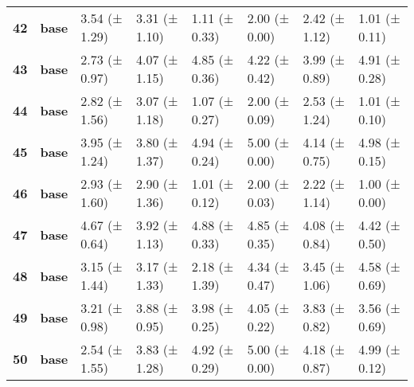 \begin{longtable}{llllllll}
\cline{1-8}
\textbf{42} & \textbf{base} & 3.54 (± 1.29) & 3.31 (± 1.10) & 1.11 (± 0.33) & 2.00 (± 0.00) & 2.42 (± 1.12) & 1.01 (± 0.11) \\
\cline{1-8}
\textbf{43} & \textbf{base} & 2.73 (± 0.97) & 4.07 (± 1.15) & 4.85 (± 0.36) & 4.22 (± 0.42) & 3.99 (± 0.89) & 4.91 (± 0.28) \\
\cline{1-8}
\textbf{44} & \textbf{base} & 2.82 (± 1.56) & 3.07 (± 1.18) & 1.07 (± 0.27) & 2.00 (± 0.09) & 2.53 (± 1.24) & 1.01 (± 0.10) \\
\cline{1-8}
\textbf{45} & \textbf{base} & 3.95 (± 1.24) & 3.80 (± 1.37) & 4.94 (± 0.24) & 5.00 (± 0.00) & 4.14 (± 0.75) & 4.98 (± 0.15) \\
\cline{1-8}
\textbf{46} & \textbf{base} & 2.93 (± 1.60) & 2.90 (± 1.36) & 1.01 (± 0.12) & 2.00 (± 0.03) & 2.22 (± 1.14) & 1.00 (± 0.00) \\
\cline{1-8}
\textbf{47} & \textbf{base} & 4.67 (± 0.64) & 3.92 (± 1.13) & 4.88 (± 0.33) & 4.85 (± 0.35) & 4.08 (± 0.84) & 4.42 (± 0.50) \\
\cline{1-8}
\textbf{48} & \textbf{base} & 3.15 (± 1.44) & 3.17 (± 1.33) & 2.18 (± 1.39) & 4.34 (± 0.47) & 3.45 (± 1.06) & 4.58 (± 0.69) \\
\cline{1-8}
\textbf{49} & \textbf{base} & 3.21 (± 0.98) & 3.88 (± 0.95) & 3.98 (± 0.25) & 4.05 (± 0.22) & 3.83 (± 0.82) & 3.56 (± 0.69) \\
\cline{1-8}
\textbf{50} & \textbf{base} & 2.54 (± 1.55) & 3.83 (± 1.28) & 4.92 (± 0.29) & 5.00 (± 0.00) & 4.18 (± 0.87) & 4.99 (± 0.12) \\
\cline{1-8}
\end{longtable}
